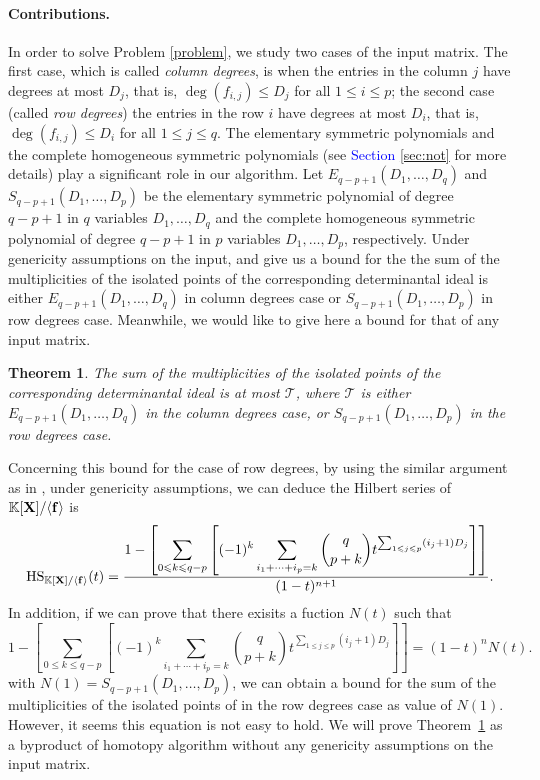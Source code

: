 \documentclass[11pt]{article}
\numberwithin{Property}{section}
\newtheorem{Theorem}{Theorem}%
\numberwithin{Theorem}{section}
\numberwithin{Proposition}{section}
\numberwithin{Lemma}{section}
\numberwithin{Corollary}{section}
\numberwithin{Definition}{section}
\numberwithin{Remark}{section}
\numberwithin{Conjecture}{section}
\numberwithin{Problem}{section}
\numberwithin{Claim}{section}
\theoremstyle{definition}
\numberwithin{Example}{section}
\def\f {\ensuremath{\mathbf{f}}}
\renewcommand{\leq}{\leqslant}
\newcommand{\field}{\mathbb{K}} %
\newcommand{\mat}[1]{\mathbf{\MakeUppercase{#1}}} %
\newcommand{\improve}[1]{\textcolor{blue}{#1}} %
\begin{document}
\paragraph{Contributions.} In order to solve Problem \ref{problem}, we study two cases of the input matrix. The first case, which is called \emph{column degrees}, is when the entries in the column $j$ have degrees at most $D_j$, that is, $\deg(f_{i,j}) \leq D_j$ for all $1 \leq i \leq p$; the second case (called \emph{row degrees}) the entries in the row $i$ have degrees at most $D_i$, that is, $\deg(f_{i,j}) \leq D_i$ for all $1 \leq j \leq q$. The elementary symmetric polynomials and the complete homogeneous symmetric polynomials (see \improve{Section \ref{sec:not}} for more details) play a significant role in our algorithm. Let $E_{q-p+1}(D_1, \ldots, D_q)$ and $S_{q-p+1}(D_1, \ldots, D_p)$ be the elementary symmetric polynomial of degree $q-p+1$ in $q$ variables $D_1, \ldots, D_q$ and the complete homogeneous symmetric polynomial of degree $q-p+1$ in $p$ variables $D_1, \ldots, D_p$, respectively. Under genericity assumptions on the input, \cite[Proposition A.6~]{NieRan09} and \cite[Exercises 15.5 $\&$ 15.12]{Miller04} give us a bound for the the sum of the multiplicities of the isolated points of the corresponding determinantal ideal is either $E_{q-p+1}(D_1, \ldots, D_q)$ in column degrees case or $S_{q-p+1}(D_1, \ldots, D_p)$ in row degrees case. Meanwhile, we would like to give here a bound for that of any input matrix. 
\begin{Theorem} \label{thm}
The sum of the multiplicities of the isolated points of the corresponding determinantal ideal is at most $\mathcal{T}$, where $\mathcal{T}$ is either $E_{q-p+1}(D_1, \ldots, D_q)$ in the column degrees case, or $S_{q-p+1}(D_1, \ldots, D_p)$ in the row degrees case.
\end{Theorem}

Concerning this bound for the case of row degrees, by using the similar argument as in \cite[Section~3]{Spa14}, under genericity assumptions, we can deduce the Hilbert series of $\field[\mat{X}]/\langle \f \rangle $ is 
\[
\mathrm{HS}_{\field[\mat{X}]/\langle \f \rangle}(t) = \frac{1 - \left[\displaystyle \sum_{0 \leq k \leq q-p} \left[ (-1)^k \sum_{i_1 + \cdots + i_p = k} {{q}\choose{p+k}} t^{\sum_{1 \leq j \leq p}(i_j+1)D_j}\right] \right]}{(1-t)^{n+1}}.
\]
In addition, if we can prove that there exisits a fuction $N(t)$ such that $$
1 - \left[\displaystyle \sum_{0 \leq k \leq q-p} \left[ (-1)^k \sum_{i_1 + \cdots + i_p = k} {{q}\choose{p+k}} t^{\sum_{1 \leq j \leq p}(i_j+1)D_j}\right]\right] = (1-t)^n N(t).
$$
with $N(1) = S_{q-p+1}(D_1, \ldots, D_p)$, we can obtain a bound for the sum of the multiplicities of the isolated points of in the row degrees case as value of $N(1)$. However, it seems this equation is not easy to hold. We will prove Theorem~\ref{thm} as a byproduct of homotopy algorithm without any genericity assumptions on the input matrix. 
\end{document}
